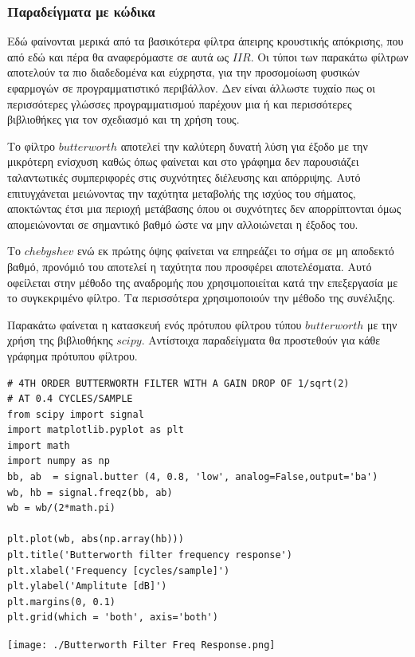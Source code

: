 \documentclass[breaklines=true, 12pt]{article}
\begin{document}
\subsubsection{Παραδείγματα με κώδικα}
\label{sec:orgb5d766d}
Εδώ φαίνονται μερικά από τα βασικότερα φίλτρα άπειρης κρουστικής απόκρισης, που
από εδώ και πέρα θα αναφερόμαστε σε αυτά ως \(IIR\). Οι τύποι των παρακάτω φίλτρων
αποτελούν τα πιο διαδεδομένα και εύχρηστα, για την προσομοίωση φυσικών εφαρμογών
σε προγραμματιστικό περιβάλλον. Δεν είναι άλλωστε τυχαίο πως οι περισσότερες
γλώσσες προγραμματισμού παρέχουν μια ή και περισσότερες βιβλιοθήκες για τον
σχεδιασμό και τη χρήση τους.

Το φίλτρο \(butterworth\) αποτελεί την καλύτερη δυνατή λύση για έξοδο με την μικρότερη
ενίσχυση καθώς όπως φαίνεται και στο γράφημα δεν παρουσιάζει ταλαντωτικές
συμπεριφορές στις συχνότητες διέλευσης και απόρριψης. Αυτό επιτυγχάνεται
μειώνοντας την ταχύτητα μεταβολής της ισχύος του σήματος, αποκτώντας έτσι μια
περιοχή μετάβασης όπου οι συχνότητες δεν απορρίπτονται όμως απομειώνονται σε
σημαντικό βαθμό ώστε να μην αλλοιώνεται η έξοδος του.

Το \(chebyshev\) ενώ εκ πρώτης όψης φαίνεται να επηρεάζει το σήμα σε μη
αποδεκτό βαθμό, προνόμιό του αποτελεί η ταχύτητα που προσφέρει αποτελέσματα.
Αυτό οφείλεται στην μέθοδο της αναδρομής που χρησιμοποιείται κατά την επεξεργασία
με το συγκεκριμένο φίλτρο. Τα περισσότερα χρησιμοποιούν την μέθοδο της συνέλιξης.

Παρακάτω φαίνεται η κατασκευή ενός πρότυπου φίλτρου τύπου \(butterworth\) με την χρήση
της βιβλιοθήκης \(scipy\). Αντίστοιχα παραδείγματα θα προστεθούν για κάθε γράφημα
πρότυπου φίλτρου.

\begin{verbatim}
# 4TH ORDER BUTTERWORTH FILTER WITH A GAIN DROP OF 1/sqrt(2)
# AT 0.4 CYCLES/SAMPLE
from scipy import signal
import matplotlib.pyplot as plt
import math
import numpy as np
bb, ab  = signal.butter (4, 0.8, 'low', analog=False,output='ba')
wb, hb = signal.freqz(bb, ab)
wb = wb/(2*math.pi)

plt.plot(wb, abs(np.array(hb)))
plt.title('Butterworth filter frequency response')
plt.xlabel('Frequency [cycles/sample]')
plt.ylabel('Amplitute [dB]')
plt.margins(0, 0.1)
plt.grid(which = 'both', axis='both')
\end{verbatim}

\begin{center}
\texttt{[image: ./Butterworth Filter Freq Response.png]}
\end{center}
\end{document}
